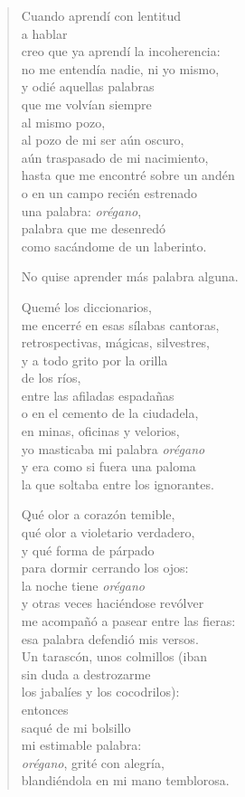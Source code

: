 \documentclass[12pt]{article}
\begin{document}
\clearpage
{}
\begin{verse}

Cuando aprendí con lentitud\\
a hablar\\
creo que ya aprendí la incoherencia:\\
no me entendía nadie, ni yo mismo,\\
y odié aquellas palabras\\
que me volvían siempre\\
al mismo pozo,\\
al pozo de mi ser aún oscuro,\\
aún traspasado de mi nacimiento,\\
hasta que me encontré sobre un andén\\
o en un campo recién estrenado\\
una palabra: \emph{orégano},\\
palabra que me desenredó\\
como sacándome de un laberinto.  

No quise aprender más palabra alguna.  

Quemé los diccionarios,\\
me encerré en esas sílabas cantoras,\\
retrospectivas, mágicas, silvestres,\\
y a todo grito por la orilla\\
de los ríos,\\
entre las afiladas espadañas\\
o en el cemento de la ciudadela,\\
en minas, oficinas y velorios,\\
yo masticaba mi palabra \emph{orégano}\\
y era como si fuera una paloma\\
la que soltaba entre los ignorantes.  

Qué olor a corazón temible,\\
qué olor a violetario verdadero,\\
y qué forma de párpado\\
para dormir cerrando los ojos:\\
la noche tiene \emph{orégano}\\
y otras veces haciéndose revólver\\
me acompañó a pasear entre las fieras:\\
esa palabra defendió mis versos.\\
Un tarascón, unos colmillos (iban\\
sin duda a destrozarme\\
los jabalíes y los cocodrilos):\\
entonces\\
saqué de mi bolsillo\\
mi estimable palabra:\\
\emph{orégano}, grité con alegría,\\
blandiéndola en mi mano temblorosa.  


\end{verse}
\end{document}
